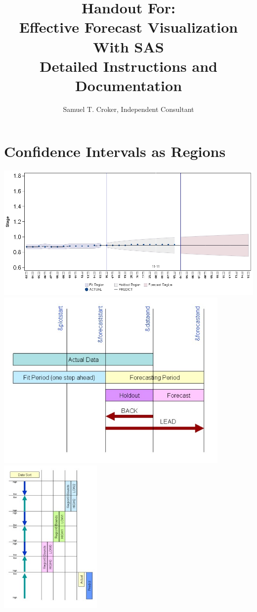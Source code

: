 \documentclass[10pt]{sugconf-ish}
\title{ Handout For:\\Effective Forecast Visualization With SAS \SASregistered\\Detailed Instructions and Documentation}
\author{Samuel T. Croker,  Independent Consultant}
\begin{document}
\section{Confidence Intervals as Regions}
\includegraphics[width=6.5in]{3reg.jpg}\\
\includegraphics[width=4.5in]{layout.jpg}
\includegraphics[height=3in]{ConfSort.jpg}
\end{document}
